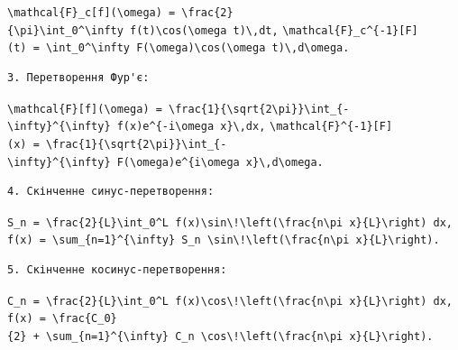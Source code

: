 \documentclass[
  ukrainian,
]{article}
\begin{document}
\texttt{\textbackslash{}mathcal\{F\}\_c{[}f{]}(\textbackslash{}omega)\ =\ \textbackslash{}frac\{2\}\{\textbackslash{}pi\}\textbackslash{}int\_0\^{}\textbackslash{}infty\ f(t)\textbackslash{}cos(\textbackslash{}omega\ t)\textbackslash{},dt,}
\texttt{\textbackslash{}mathcal\{F\}\_c\^{}\{-1\}{[}F{]}(t)\ =\ \textbackslash{}int\_0\^{}\textbackslash{}infty\ F(\textbackslash{}omega)\textbackslash{}cos(\textbackslash{}omega\ t)\textbackslash{},d\textbackslash{}omega.}

\begin{verbatim}
3. Перетворення Фур'є:
\end{verbatim}

\texttt{\textbackslash{}mathcal\{F\}{[}f{]}(\textbackslash{}omega)\ =\ \textbackslash{}frac\{1\}\{\textbackslash{}sqrt\{2\textbackslash{}pi\}\}\textbackslash{}int\_\{-\textbackslash{}infty\}\^{}\{\textbackslash{}infty\}\ f(x)e\^{}\{-i\textbackslash{}omega\ x\}\textbackslash{},dx,}
\texttt{\textbackslash{}mathcal\{F\}\^{}\{-1\}{[}F{]}(x)\ =\ \textbackslash{}frac\{1\}\{\textbackslash{}sqrt\{2\textbackslash{}pi\}\}\textbackslash{}int\_\{-\textbackslash{}infty\}\^{}\{\textbackslash{}infty\}\ F(\textbackslash{}omega)e\^{}\{i\textbackslash{}omega\ x\}\textbackslash{},d\textbackslash{}omega.}

\begin{verbatim}
4. Скінченне синус-перетворення:
\end{verbatim}

\texttt{S\_n\ =\ \textbackslash{}frac\{2\}\{L\}\textbackslash{}int\_0\^{}L\ f(x)\textbackslash{}sin\textbackslash{}!\textbackslash{}left(\textbackslash{}frac\{n\textbackslash{}pi\ x\}\{L\}\textbackslash{}right)\ dx,}
\texttt{f(x)\ =\ \textbackslash{}sum\_\{n=1\}\^{}\{\textbackslash{}infty\}\ S\_n\ \textbackslash{}sin\textbackslash{}!\textbackslash{}left(\textbackslash{}frac\{n\textbackslash{}pi\ x\}\{L\}\textbackslash{}right).}

\begin{verbatim}
5. Скінченне косинус-перетворення:
\end{verbatim}

\texttt{C\_n\ =\ \textbackslash{}frac\{2\}\{L\}\textbackslash{}int\_0\^{}L\ f(x)\textbackslash{}cos\textbackslash{}!\textbackslash{}left(\textbackslash{}frac\{n\textbackslash{}pi\ x\}\{L\}\textbackslash{}right)\ dx,}
\texttt{f(x)\ =\ \textbackslash{}frac\{C\_0\}\{2\}\ +\ \textbackslash{}sum\_\{n=1\}\^{}\{\textbackslash{}infty\}\ C\_n\ \textbackslash{}cos\textbackslash{}!\textbackslash{}left(\textbackslash{}frac\{n\textbackslash{}pi\ x\}\{L\}\textbackslash{}right).}
\end{document}
